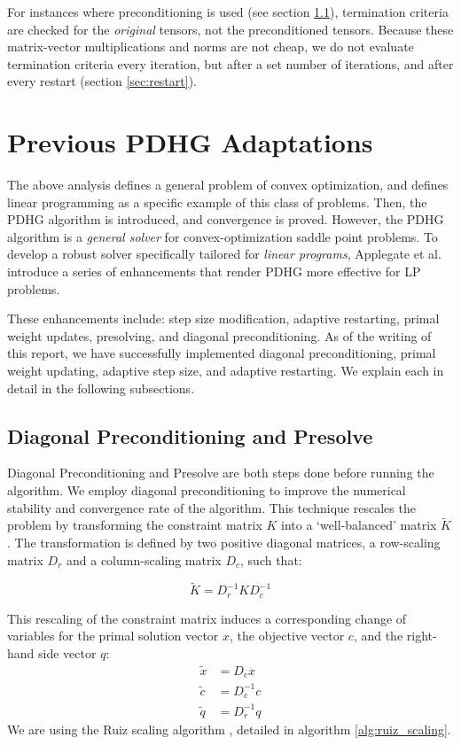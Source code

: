 \documentclass[twoside,12pt,openright]{report}  %
\begin{document}
For instances where preconditioning is used (see section \ref{precond-section}), termination criteria are checked for the \textit{original} tensors, not the preconditioned tensors. Because these matrix-vector multiplications and norms are not cheap, we do not evaluate termination criteria every iteration, but after a set number of iterations, and after every restart (section \ref{sec:restart}).
\section{Previous PDHG Adaptations}\label{sec:pdlp}
The above analysis defines a general problem of convex optimization, and defines linear programming as a specific example of this class of problems. Then, the PDHG algorithm is introduced, and convergence is proved. However, the PDHG algorithm is a \textit{general solver} for convex-optimization saddle point problems. To develop a robust solver specifically tailored for \textit{linear programs}, Applegate et al. introduce a series of enhancements \cite{applegate2} that render PDHG more effective for LP problems.

These enhancements include: step size modification, adaptive restarting, primal weight updates, presolving, and diagonal preconditioning. As of the writing of this report, we have successfully implemented diagonal preconditioning, primal weight updating, adaptive step size, and adaptive restarting. We explain each in detail in the following subsections.

\subsection{Diagonal Preconditioning and Presolve}\label{precond-section}
Diagonal Preconditioning and Presolve are both steps done before running the algorithm. We employ diagonal preconditioning to improve the numerical stability and convergence rate of the algorithm. This technique rescales the problem by transforming the constraint matrix $K$ into a `well-balanced’ matrix $\tilde{K}$. The transformation is defined by two positive diagonal matrices, a row-scaling matrix $D_r$ and a column-scaling matrix $D_c$, such that:

\[
\tilde{K} = D_r^{-1} K D_c^{-1}
\]

This rescaling of the constraint matrix induces a corresponding change of variables for the primal solution vector $x$, the objective vector $c$, and the right-hand side vector $q$:
\begin{align*}
\tilde{x} &= D_cx \\
\tilde{c} &= D_c^{-1} c \\
\tilde{q} &= D_r^{-1} q
\end{align*}
We are using the Ruiz scaling algorithm \cite{ruiz2001scaling}, detailed in algorithm \ref{alg:ruiz_scaling}.
\end{document}
